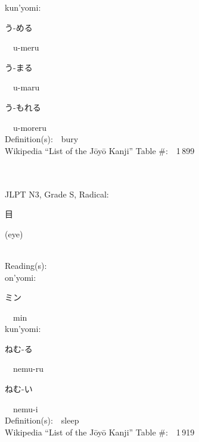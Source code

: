 \begin{multicols}{2}
{\hspace*{1em}}kun'yomi:\ \ \\
{\hspace*{2em}}{\begin{CJK}{UTF8}{min} う-める \end{CJK}}\ \ u-meru\ \ \\
{\hspace*{2em}}{\begin{CJK}{UTF8}{min} う-まる \end{CJK}}\ \ u-maru\ \ \\
{\hspace*{2em}}{\begin{CJK}{UTF8}{min} う-もれる \end{CJK}}\ \ u-moreru\ \ \\
Definition(s):\ \ bury \\
Wikipedia ``List of the J\=oy\=o Kanji'' Table \#:\ \ 1\,899 \\
\ \ \\
{\fontsize{34pt}{40pt}  }\ \ \\  %
{JLPT N3, Grade S, Radical:\ \ {\begin{CJK}{UTF8}{min} 目 \end{CJK}} (eye) } \\
Reading(s):\ \ \\
{\hspace*{1em}}on'yomi:\ \ \\
{\hspace*{2em}}{\begin{CJK}{UTF8}{min} ミン \end{CJK}}\ \ min\ \ \\
{\hspace*{1em}}kun'yomi:\ \ \\
{\hspace*{2em}}{\begin{CJK}{UTF8}{min} ねむ-る \end{CJK}}\ \ nemu-ru\ \ \\
{\hspace*{2em}}{\begin{CJK}{UTF8}{min} ねむ-い \end{CJK}}\ \ nemu-i\ \ \\
Definition(s):\ \ sleep \\
Wikipedia ``List of the J\=oy\=o Kanji'' Table \#:\ \ 1\,919 \\

\end{multicols}
